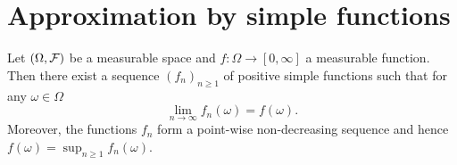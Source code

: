 %

\section{Approximation by simple functions}
\label{sec:simple-approximation}

\begin{proposition}\label{prop:approximation_simple}
Let $(\Omega, \mathcal F)$ be a measurable space and $f : \Omega \to [0,\infty]$ a measurable function. Then there exist a sequence $(f_n)_{n \ge 1}$ of positive simple functions such that for any $\omega \in \Omega$
\[
	\lim_{n \to \infty} f_n(\omega) = f(\omega).
\]
Moreover, the functions $f_n$ form a point-wise non-decreasing sequence and hence $f(\omega) = \sup_{n \ge 1} f_n(\omega)$.
\end{proposition}

